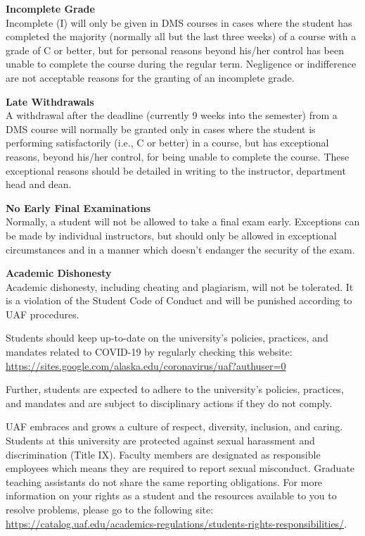 \documentclass[12pt]{article}
\renewcommand{\emph}[1]{\textsf{\textbf{#1}}}
\newcommand{\localhead}[1]{\par\smallskip\textbf{#1}\nobreak\\}%
\def\subheading#1{\localhead{\emph{#1}}}
\begin{document}
\subheading{Incomplete Grade} 
Incomplete (I) will only be given in
  DMS courses in cases where
  the student has completed the majority (normally all but the last
  three weeks) of a course with a grade of C or better, but for
  personal reasons beyond his/her control has been unable to complete
  the course during the regular term. Negligence or indifference are
  not acceptable reasons for the granting of an incomplete
  grade. 

\subheading{Late Withdrawals} 
A withdrawal after the deadline
  (currently 9 weeks into the semester) from a DMS course will
  normally be granted only in cases where the student is performing
  satisfactorily (i.e., C or better) in a course, but has exceptional
  reasons, beyond his/her control, for being unable to complete the
  course. These exceptional reasons should be detailed in writing to
  the instructor, department head and dean.

\subheading{No Early Final Examinations}
 Normally, a student will not be
  allowed to take a final exam early. Exceptions can be made by
  individual instructors, but should only be allowed in exceptional
  circumstances and in a manner which doesn't endanger the security of
  the exam.

\subheading{Academic Dishonesty}
Academic dishonesty, including cheating and plagiarism, will not
be tolerated.  It is a violation of the Student Code of Conduct
and will be punished according to UAF procedures.

 
  Students should keep up-to-date on the university's policies, practices, and mandates related to COVID-19 by regularly checking this website: \url{https://sites.google.com/alaska.edu/coronavirus/uaf?authuser=0}

Further, students are expected to adhere to the university's policies, practices, and mandates and are subject to disciplinary actions if they do not comply.

 UAF embraces and grows a culture of respect, diversity, inclusion, and caring. Students at this university are protected against sexual harassment and discrimination (Title IX). Faculty members are designated as responsible employees which means they are required to report sexual misconduct. Graduate teaching assistants do not share the same reporting obligations. For more information on your rights as a student and the resources available to you to resolve problems, please go to the following site: \url{https://catalog.uaf.edu/academics-regulations/students-rights-responsibilities/}.
\end{document}
